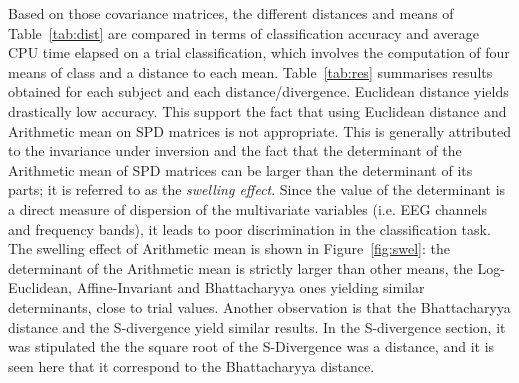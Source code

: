 Based on those covariance matrices, the different distances and means of Table~\ref{tab:dist} are compared in terms of classification accuracy and average CPU time elapsed on a trial classification, which involves the computation of four means of class and a distance to each mean.
Table~\ref{tab:res} summarises results obtained for each subject and each distance/divergence.
Euclidean distance yields drastically low accuracy. 
This support the fact that using Euclidean distance and Arithmetic mean on SPD matrices is not appropriate. 
This is generally attributed to the invariance under inversion and the fact that the determinant of the Arithmetic mean of SPD matrices can be larger than the determinant of its parts; it is referred to as the \textit{swelling effect}.
Since the value of the determinant is a direct measure of dispersion of the multivariate variables (i.e. EEG channels and frequency bands), it leads to poor discrimination in the classification task. 
The swelling effect of Arithmetic mean is shown in Figure~\ref{fig:swel}: the determinant of the Arithmetic mean is strictly larger than other means, the Log-Euclidean, Affine-Invariant and Bhattacharyya ones yielding similar determinants, close to trial values.
Another observation is that the Bhattacharyya distance and the S-divergence yield similar results. In the S-divergence section, it was stipulated the the square root of the S-Divergence was a distance, and it is seen here that it correspond to the Bhattacharyya distance.
%
